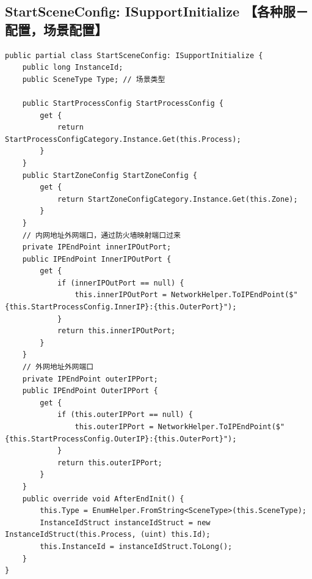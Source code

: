 \documentclass[9pt, b5paper]{article}
\begin{document}
\subsection{StartSceneConfig: ISupportInitialize 【各种服－配置，场景配置】}
\label{sec-1-11}
\begin{verbatim}
public partial class StartSceneConfig: ISupportInitialize {
    public long InstanceId;
    public SceneType Type; // 场景类型

    public StartProcessConfig StartProcessConfig {
        get {
            return StartProcessConfigCategory.Instance.Get(this.Process);
        }
    }
    public StartZoneConfig StartZoneConfig {
        get {
            return StartZoneConfigCategory.Instance.Get(this.Zone);
        }
    }
    // 内网地址外网端口，通过防火墙映射端口过来
    private IPEndPoint innerIPOutPort;
    public IPEndPoint InnerIPOutPort {
        get {
            if (innerIPOutPort == null) {
                this.innerIPOutPort = NetworkHelper.ToIPEndPoint($"{this.StartProcessConfig.InnerIP}:{this.OuterPort}");
            }
            return this.innerIPOutPort;
        }
    }
    // 外网地址外网端口
    private IPEndPoint outerIPPort;
    public IPEndPoint OuterIPPort {
        get {
            if (this.outerIPPort == null) {
                this.outerIPPort = NetworkHelper.ToIPEndPoint($"{this.StartProcessConfig.OuterIP}:{this.OuterPort}");
            }
            return this.outerIPPort;
        }
    }
    public override void AfterEndInit() {
        this.Type = EnumHelper.FromString<SceneType>(this.SceneType);
        InstanceIdStruct instanceIdStruct = new InstanceIdStruct(this.Process, (uint) this.Id);
        this.InstanceId = instanceIdStruct.ToLong();
    }
}
\end{verbatim}
\end{document}
